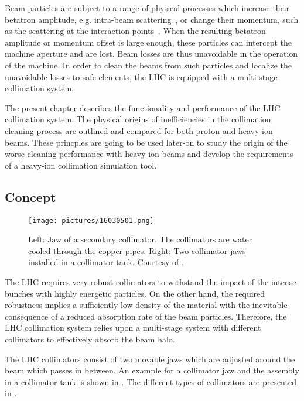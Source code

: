 Beam particles are subject to a range of physical processes which increase their betatron amplitude, e.g. intra-beam scattering~\cite{ICHEA:PIWINSKI,PartACC13115}, or change their momentum, such as the scattering at the interaction points~\cite{}. When the resulting betatron amplitude or momentum offset is large enough, these particles can intercept the machine aperture and are lost. Beam losses are thus unavoidable in the operation of the machine. In order to clean the beams from such particles and localize the unavoidable losses to safe elements, the LHC is equipped with a multi-stage collimation system. 

The present chapter describes the functionality and performance of the LHC collimation system. The physical origins of inefficiencies in the collimation cleaning process are outlined and compared for both proton and heavy-ion beams. These princples are going to be used later-on to study the origin of the worse cleaning performance with heavy-ion beams and develop the requirements of a heavy-ion collimation simulation tool.

%

%
%
\subsection{Concept}
%

\begin{figure}[b]  
    \centering
    \texttt{[image: pictures/16030501.png]}
    \caption{Left: Jaw of a secondary collimator. The collimators are water cooled through the copper pipes. Right: Two collimator jaws installed in a collimator tank. Courtesy of \cite{Bruce2014a}.}  
    \label{pic:16030501}
\end{figure}


The LHC requires very robust collimators to withstand the impact of the intense bunches with highly energetic particles. On the other hand, the required robustness implies a sufficiently low density of the material with the inevitable consequence of a reduced absorption rate of the beam particles. Therefore, the LHC collimation system relies upon a multi-stage system with different collimators to effectively absorb the beam halo.  

The LHC collimators consist of two movable jaws which are adjusted around the beam which passes in between. An example for a collimator jaw and the assembly in a collimator tank is shown in . The different types of collimators are presented in .

